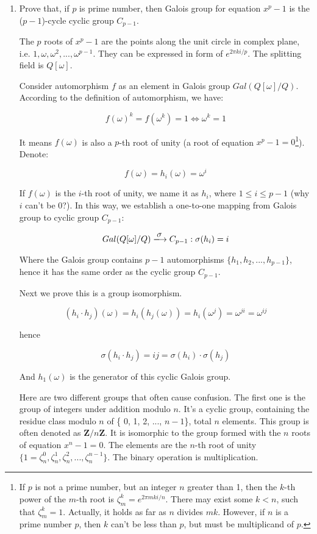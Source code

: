 \documentclass[UTF8]{article}
\begin{document}
\begin{enumerate}
\item{Prove that, if $p$ is prime number, then Galois group for equation $x^p - 1$ is the ($p-1$)-cycle cyclic group $C_{p-1}$.}

The $p$ roots of $x^p - 1$ are the points along the unit circle in complex plane, i.e. $1, \omega, \omega^2, ..., \omega^{p-1}$. They can be expressed in form of $e^{2 \pi k i / p}$. The splitting field is $Q[\omega]$.

Consider automorphism $f$ as an element in Galois group $Gal(Q[\omega]/Q)$. According to the definition of automorphism, we have:

\[
f(\omega)^k = f(\omega^k) = 1 \iff \omega^k = 1
\]

It means $f(\omega)$ is also a $p$-th root of unity (a root of equation $x^p - 1 = 0$\footnote{If $p$ is not a prime number, but an integer $n$ greater than 1, then the $k$-th power of the $m$-th root is $\zeta_m^k = e^{2 \pi m k i / n}$. There may exist some $k < n$, such that $\zeta_m^k = 1$. Actually, it holds as far as $n$ divides $mk$. However, if $n$ is a prime number $p$, then $k$ can't be less than $p$, but must be multiplicand of $p$.}). Denote:

\[
f(\omega) = h_i(\omega) = \omega^{i}
\]

If $f(\omega)$ is the $i$-th root of unity, we name it as $h_i$, where $1 \leq i \leq p-1$ (why $i$ can't be 0?). In this way, we establish a one-to-one mapping from Galois group to cyclic group $C_{p-1}$:

\[
Gal(Q[\omega]/Q) \arrowto{\sigma} C_{p-1} :  \sigma(h_i) = i
\]

Where the Galois group contains $p-1$ automorphisms $\{h_1, h_2, ..., h_{p-1}\}$, hence it has the same order as the cyclic group $C_{p-1}$.

Next we prove this is a group isomorphism.

\[
(h_i \cdot h_j)(\omega) = h_i(h_j(\omega)) = h_i(\omega^j) = \omega^{ji} = \omega^{ij}
\]

hence

\[
\sigma(h_i \cdot h_j) = ij = \sigma(h_i) \cdot \sigma(h_j)
\]

And $h_1(\omega)$ is the generator of this cyclic Galois group.

\begin{mdframed}
Here are two different groups that often cause confusion. The first one is the group of integers under addition modulo $n$. It's a cyclic group, containing the residue class modulo $n$ of \{ 0, 1, 2, ..., $n - 1$\}, total $n$ elements. This group is often denoted as $\pmb{Z}/n\pmb{Z}$. It is isomorphic to the group formed with the $n$ roots of equation $x^n - 1 = 0$. The elements are the $n$-th root of unity $\{1 = \zeta_n^0, \zeta_n^1, \zeta_n^2, ..., \zeta_n^{n-1}\}$. The binary operation is multiplication.


\end{mdframed}
\end{enumerate}
\end{document}
